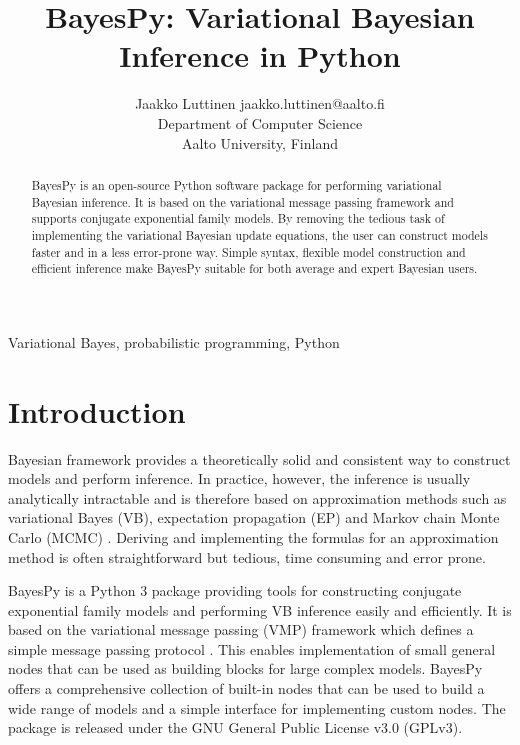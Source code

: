 \documentclass[twoside,11pt]{article}
\begin{document}
\title{BayesPy: Variational Bayesian Inference in Python}

\author{\name Jaakko Luttinen \email jaakko.luttinen@aalto.fi \\
       \addr Department of Computer Science\\
       Aalto University, Finland}


\maketitle

\begin{abstract}%
  BayesPy is an open-source Python software package for performing variational
  Bayesian inference.  It is based on the variational message passing framework
  and supports conjugate exponential family models.  By removing the tedious
  task of implementing the variational Bayesian update equations, the user can
  construct models faster and in a less error-prone way.  Simple syntax,
  flexible model construction and efficient inference make BayesPy suitable for
  both average and expert Bayesian users.
\end{abstract}

\begin{keywords}
  Variational Bayes, probabilistic programming,
  Python
\end{keywords}

\section{Introduction}

Bayesian framework provides a theoretically solid and consistent way to
construct models and perform inference.  In practice, however, the inference is
usually analytically intractable and is therefore based on approximation methods
such as variational Bayes (VB), expectation propagation (EP) and Markov chain
Monte Carlo (MCMC) \citep{Bishop:2006}.  Deriving and implementing the formulas
for an approximation method is often straightforward but tedious, time consuming
and error prone.


BayesPy is a Python 3 package providing tools for constructing conjugate
exponential family models and performing VB inference easily and efficiently.
It is based on the variational message passing (VMP) framework which defines a
simple message passing protocol \citep{Winn:2005}.  This enables implementation
of small general nodes that can be used as building blocks for large complex
models.  BayesPy offers a comprehensive collection of built-in nodes that can be
used to build a wide range of models and a simple interface for implementing
custom nodes.  The package is released under the GNU General Public License v3.0
(GPLv3).
\end{document}
